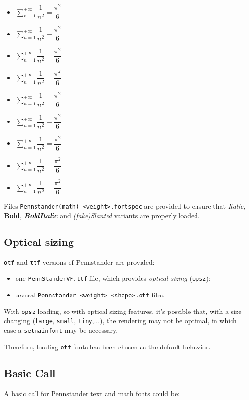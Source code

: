 \documentclass[a4paper]{scrartcl}
\newcommand*{\file}[1]{\texttt{#1}}
\newcommand*{\opt}[1]{\texttt{#1}}
\newcommand{\sampleformula}{\displaystyle\sum_{n=1}^{+\infty} \dfrac{1}{n^2} = \dfrac{\pi^2}{6}}
\begin{document}
\begin{itemize}
	\item {$\sampleformula$}
	\item {$\sampleformula$}
	\item {$\sampleformula$}
	\item {$\sampleformula$}
	\item {$\sampleformula$}
	\item {$\sampleformula$}
	\item {$\sampleformula$}
	\item {$\sampleformula$}
	\item {$\sampleformula$}
\end{itemize}

\smallskip

Files \file{Pennstander(math)-<weight>.fontspec} are provided to ensure that \textit{Italic}, \textbf{Bold}, \textbf{\textit{BoldItalic}} and \textsl{(fake)Slanted} variants are properly loaded.

\subsection{Optical sizing}

\texttt{otf} and \texttt{ttf} versions of Pennstander are provided:

\begin{itemize}
	\item one \texttt{PennStanderVF.ttf} file, which provides \textit{optical sizing} (\texttt{opsz});
	\item several \texttt{Pennstander-<weight>-<shape>.otf} files.
\end{itemize}

With \opt{opsz} loading, so with optical sizing features, it's possible that, with a size changing (\texttt{large}, \texttt{small}, \texttt{tiny},...), the rendering may not be optimal, in which case a \opt{setmainfont} may be necessary.

Therefore, loading \texttt{otf} fonts has been chosen as the default behavior.

\subsection{Basic Call}

A basic call for Pennstander text and math fonts could be:
\end{document}
